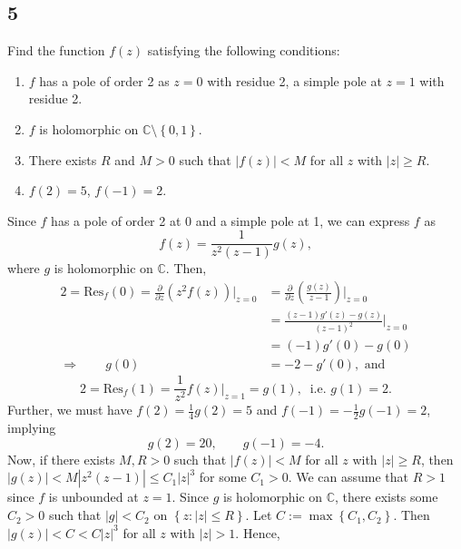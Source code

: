 \documentclass[12pt]{article}
\begin{document}
\subsection*{5}
\begin{tcolorbox}
Find the function $f(z)$ satisfying the following conditions:
\begin{enumerate}[label=(\alph*)]
\item $f$ has a pole of order 2 as $z = 0$ with residue 2, a simple pole at $z = 1$ with residue 2.
\item $f$ is holomorphic on $\mathbb{C} \setminus \left\{ 0,1 \right\}$.
\item There exists $R$ and $M > 0$ such that $|f(z)| < M$ for all $z$ with $|z| \geq R$.
\item $f(2) = 5$, $f(-1) = 2$.
\end{enumerate}
\end{tcolorbox}
Since $f$ has a pole of order 2 at 0 and a simple pole at 1, we can express $f$ as 
\[ f(z) = \frac{1}{z^{2}(z-1)}g(z), \]
where $g$ is holomorphic on $\mathbb{C}$. Then,
\begin{align}
2 = \text{Res}_{f}(0) = \frac{\partial }{\partial z}\left( z^{2}f(z) \right)\bigg|_{z=0} & = \frac{\partial }{\partial z}\left( \frac{g(z)}{z-1}
\right)\bigg|_{z = 0} \nonumber \\
& = \frac{(z-1)g'(z) - g(z)}{(z-1)^{2}}\bigg|_{z=0}\nonumber \\
& = (-1)g'(0) - g(0) \nonumber \\
\Rightarrow  \qquad g(0) & = -2 - g'(0), \text{ and }\label{5.1} 
\end{align}
\begin{equation}
2 = \text{Res}_{f}(1) = \frac{1}{z^{2}}f(z)\bigg|_{z = 1} = g(1), \ \text{ i.e. } g(1) = 2.
\label{5.2}
\end{equation}
Further, we must have $f(2) = \frac{1}{4}g(2) = 5$ and $f(-1) = -\frac{1}{2}g(-1) = 2$, implying 
\begin{equation}
g(2) = 20, \qquad g(-1) = -4.
\label{5.3}
\end{equation}
Now, if there exists $M, R > 0$ such that $|f(z)| < M$ for all $z$ with $|z| \geq R$, then $|g(z)| < M|z^{2}(z-1)| \leq C_{1}|z|^{3}$ for some $C_{1} > 0$.
We can assume that $R > 1$ since $f$ is unbounded at $z = 1$. Since $g$ is holomorphic on $\mathbb{C}$, there exists some $C_{2} > 0$ such that $|g| <
C_{2}$ on $\left\{ z : |z| \leq R \right\}$. Let $C := \max\left\{ C_1, C_2 \right\}$. Then $|g(z)| < C < C|z|^{3}$ for all $z$ with $|z| > 1$. Hence,
\end{document}
